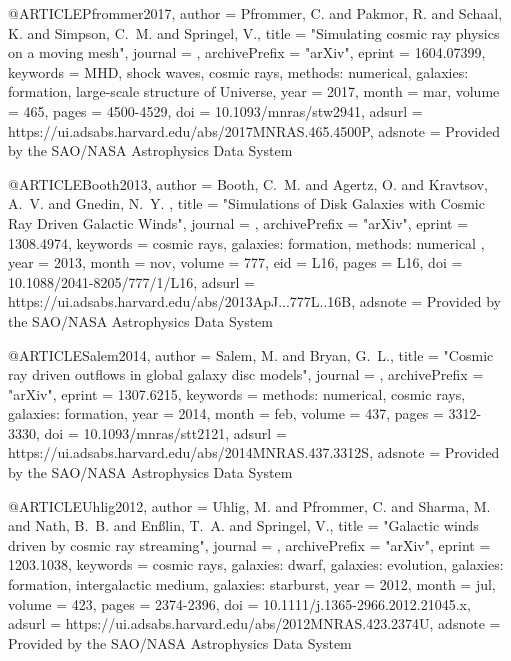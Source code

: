 \documentclass[useAMS,usenatbib]{mnras}
\begin{document}
{{{{{{{@ARTICLE{Pfrommer2017,
   author = {{Pfrommer}, C. and {Pakmor}, R. and {Schaal}, K. and {Simpson}, C.~M. and 
	{Springel}, V.},
    title = "{Simulating cosmic ray physics on a moving mesh}",
  journal = {\mnras},
archivePrefix = "arXiv",
   eprint = {1604.07399},
 keywords = {MHD, shock waves, cosmic rays, methods: numerical, galaxies: formation, large-scale structure of Universe},
     year = 2017,
    month = mar,
   volume = 465,
    pages = {4500-4529},
      doi = {10.1093/mnras/stw2941},
   adsurl = {https://ui.adsabs.harvard.edu/abs/2017MNRAS.465.4500P},
  adsnote = {Provided by the SAO/NASA Astrophysics Data System}
}

@ARTICLE{Booth2013,
   author = {{Booth}, C.~M. and {Agertz}, O. and {Kravtsov}, A.~V. and {Gnedin}, N.~Y.
	},
    title = "{Simulations of Disk Galaxies with Cosmic Ray Driven Galactic Winds}",
  journal = {\apjl},
archivePrefix = "arXiv",
   eprint = {1308.4974},
 keywords = {cosmic rays, galaxies: formation, methods: numerical },
     year = 2013,
    month = nov,
   volume = 777,
      eid = {L16},
    pages = {L16},
      doi = {10.1088/2041-8205/777/1/L16},
   adsurl = {https://ui.adsabs.harvard.edu/abs/2013ApJ...777L..16B},
  adsnote = {Provided by the SAO/NASA Astrophysics Data System}
}

@ARTICLE{Salem2014,
   author = {{Salem}, M. and {Bryan}, G.~L.},
    title = "{Cosmic ray driven outflows in global galaxy disc models}",
  journal = {\mnras},
archivePrefix = "arXiv",
   eprint = {1307.6215},
 keywords = {methods: numerical, cosmic rays, galaxies: formation},
     year = 2014,
    month = feb,
   volume = 437,
    pages = {3312-3330},
      doi = {10.1093/mnras/stt2121},
   adsurl = {https://ui.adsabs.harvard.edu/abs/2014MNRAS.437.3312S},
  adsnote = {Provided by the SAO/NASA Astrophysics Data System}
}

@ARTICLE{Uhlig2012,
   author = {{Uhlig}, M. and {Pfrommer}, C. and {Sharma}, M. and {Nath}, B.~B. and 
	{En{\ss}lin}, T.~A. and {Springel}, V.},
    title = "{Galactic winds driven by cosmic ray streaming}",
  journal = {\mnras},
archivePrefix = "arXiv",
   eprint = {1203.1038},
 keywords = {cosmic rays, galaxies: dwarf, galaxies: evolution, galaxies: formation, intergalactic medium, galaxies: starburst},
     year = 2012,
    month = jul,
   volume = 423,
    pages = {2374-2396},
      doi = {10.1111/j.1365-2966.2012.21045.x},
   adsurl = {https://ui.adsabs.harvard.edu/abs/2012MNRAS.423.2374U},
  adsnote = {Provided by the SAO/NASA Astrophysics Data System}
}

}}}}}}}
\end{document}

